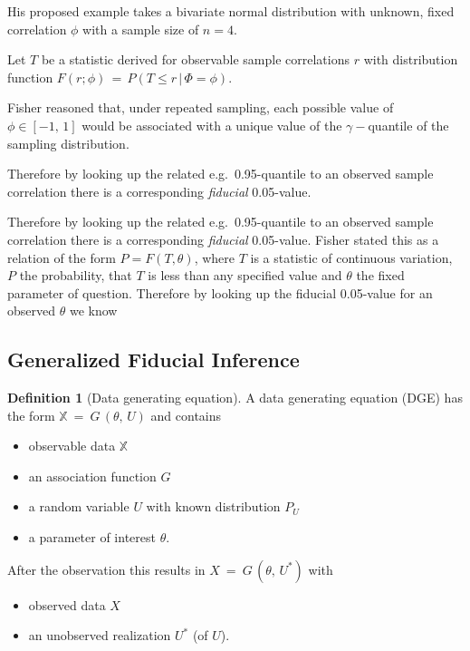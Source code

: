 \documentclass[
]{report}
\theoremstyle{definition}
\newtheorem{definition}{Definition}[section]
\begin{document}
His proposed example takes a bivariate normal distribution with unknown,
fixed correlation \(\phi\) with a sample size of \(n=4\).

Let \(T\) be a statistic derived for observable sample correlations
\(r\) with distribution function
\(F(r; \phi) \, = \, P(T \leq r \, | \, \Phi = \phi)\).

Fisher reasoned that, under repeated sampling, each possible value of
\(\phi \in [-1,\,1]\) would be associated with a unique value of the
\(\gamma-\)quantile of the sampling distribution.

Therefore by looking up the related e.g.~0.95-quantile to an observed
sample correlation there is a corresponding \textit{fiducial}
0.05-value.

Therefore by looking up the related e.g.~0.95-quantile to an observed
sample correlation there is a corresponding \textit{fiducial}
0.05-value. Fisher stated this as a relation of the form
\(P = F(T, \theta)\), where \(T\) is a statistic of continuous
variation, \(P\) the probability, that \(T\) is less than any specified
value and \(\theta\) the fixed parameter of question. Therefore by
looking up the fiducial 0.05-value for an observed \(\theta\) we know

\subsection{Generalized Fiducial Inference}

\begin{definition}[Data generating equation]
A data generating equation (DGE) has the form $\mathbb{X} \ = \  G \, (\theta, \, U)$ and contains
\begin{itemize}
  \item observable data $\mathbb{X}$
  \item an association function $G$
  \item a random variable $U$ with known distribution $P_U$
  \item a parameter of interest $\theta$.
\end{itemize}
After the observation this results in $X \ = \ G \, (\theta, \, U^*)$ with
\begin{itemize}
  \item observed data $X$
  \item an unobserved realization $U^*$ (of $U$).
\end{itemize}
\end{definition}
\end{document}
